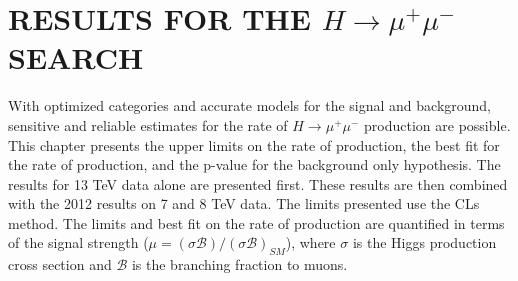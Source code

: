 \chapter{RESULTS FOR THE $H\rightarrow\mu^+\mu^-$ SEARCH} \label{results}

With optimized categories and accurate models for the signal and background, sensitive and reliable estimates for the rate of $H\rightarrow\mu^+\mu^-$ production are possible. This chapter presents the upper limits on the rate of production, the best fit for the rate of production, and the p-value for the background only hypothesis. The results for 13 TeV data alone are presented first. These results are then combined with the 2012 results on 7 and 8 TeV data. The limits presented use the CLs method. The limits and best fit on the rate of production are quantified in terms of the signal strength ($\mu = (\sigma\mathcal{B})/(\sigma\mathcal{B})_{SM}$), where $\sigma$ is the Higgs production cross section and $\mathcal{B}$ is the branching fraction to muons. 

